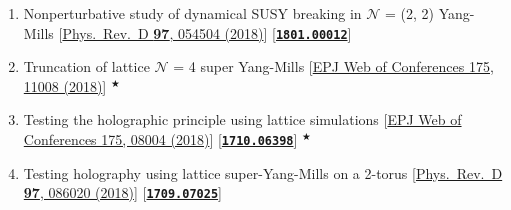 \begin{enumerate}
 \item Nonperturbative study of dynamical SUSY breaking in $\mathcal{N}$ = (2, 2) Yang-Mills [\href{https://journals.aps.org/prd/abstract/10.1103/PhysRevD.97.054504}{Phys.\ Rev.\ D {\bf 97}, 054504 (2018)}] [\texttt{\textbf{\textcolor{blue}{\href{https://arxiv.org/abs/1801.00012}{1801.00012}}}}]  
 \item Truncation of lattice $\mathcal{N}$ = 4 super Yang-Mills [\href{https://doi.org/10.1051/epjconf/201817511008}{EPJ Web of Conferences 175, 11008 (2018)}] $^{\bigstar}$
\item Testing the holographic principle using lattice simulations  [\href{https://doi.org/10.1051/epjconf/201817508004}{EPJ Web of Conferences 175, 08004 (2018)}] [\texttt{\textbf{\textcolor{blue}{\href{https://arxiv.org/abs/1710.06398}{1710.06398}}}}] $^{\bigstar}$
\item Testing holography using lattice super-Yang-Mills on a 2-torus [\href{https://journals.aps.org/prd/abstract/10.1103/PhysRevD.97.086020}{Phys.\ Rev.\ D {\bf 97}, 086020 (2018)}] [\texttt{\textbf{\textcolor{blue}{\href{https://arxiv.org/abs/1709.07025}{1709.07025}}}}]
\end{enumerate}